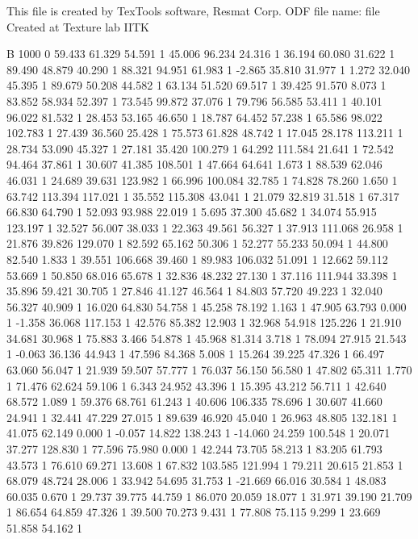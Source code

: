 This file is created by TexTools software, Resmat Corp.
ODF file name: file Created at Texture lab IITK

B 1000 0
	59.433 61.329 54.591 1
	45.006 96.234 24.316 1
	36.194 60.080 31.622 1
	89.490 48.879 40.290 1
	88.321 94.951 61.983 1
	-2.865 35.810 31.977 1
	1.272 32.040 45.395 1
	89.679 50.208 44.582 1
	63.134 51.520 69.517 1
	39.425 91.570 8.073 1
	83.852 58.934 52.397 1
	73.545 99.872 37.076 1
	79.796 56.585 53.411 1
	40.101 96.022 81.532 1
	28.453 53.165 46.650 1
	18.787 64.452 57.238 1
	65.586 98.022 102.783 1
	27.439 36.560 25.428 1
	75.573 61.828 48.742 1
	17.045 28.178 113.211 1
	28.734 53.090 45.327 1
	27.181 35.420 100.279 1
	64.292 111.584 21.641 1
	72.542 94.464 37.861 1
	30.607 41.385 108.501 1
	47.664 64.641 1.673 1
	88.539 62.046 46.031 1
	24.689 39.631 123.982 1
	66.996 100.084 32.785 1
	74.828 78.260 1.650 1
	63.742 113.394 117.021 1
	35.552 115.308 43.041 1
	21.079 32.819 31.518 1
	67.317 66.830 64.790 1
	52.093 93.988 22.019 1
	5.695 37.300 45.682 1
	34.074 55.915 123.197 1
	32.527 56.007 38.033 1
	22.363 49.561 56.327 1
	37.913 111.068 26.958 1
	21.876 39.826 129.070 1
	82.592 65.162 50.306 1
	52.277 55.233 50.094 1
	44.800 82.540 1.833 1
	39.551 106.668 39.460 1
	89.983 106.032 51.091 1
	12.662 59.112 53.669 1
	50.850 68.016 65.678 1
	32.836 48.232 27.130 1
	37.116 111.944 33.398 1
	35.896 59.421 30.705 1
	27.846 41.127 46.564 1
	84.803 57.720 49.223 1
	32.040 56.327 40.909 1
	16.020 64.830 54.758 1
	45.258 78.192 1.163 1
	47.905 63.793 0.000 1
	-1.358 36.068 117.153 1
	42.576 85.382 12.903 1
	32.968 54.918 125.226 1
	21.910 34.681 30.968 1
	75.883 3.466 54.878 1
	45.968 81.314 3.718 1
	78.094 27.915 21.543 1
	-0.063 36.136 44.943 1
	47.596 84.368 5.008 1
	15.264 39.225 47.326 1
	66.497 63.060 56.047 1
	21.939 59.507 57.777 1
	76.037 56.150 56.580 1
	47.802 65.311 1.770 1
	71.476 62.624 59.106 1
	6.343 24.952 43.396 1
	15.395 43.212 56.711 1
	42.640 68.572 1.089 1
	59.376 68.761 61.243 1
	40.606 106.335 78.696 1
	30.607 41.660 24.941 1
	32.441 47.229 27.015 1
	89.639 46.920 45.040 1
	26.963 48.805 132.181 1
	41.075 62.149 0.000 1
	-0.057 14.822 138.243 1
	-14.060 24.259 100.548 1
	20.071 37.277 128.830 1
	77.596 75.980 0.000 1
	42.244 73.705 58.213 1
	83.205 61.793 43.573 1
	76.610 69.271 13.608 1
	67.832 103.585 121.994 1
	79.211 20.615 21.853 1
	68.079 48.724 28.006 1
	33.942 54.695 31.753 1
	-21.669 66.016 30.584 1
	48.083 60.035 0.670 1
	29.737 39.775 44.759 1
	86.070 20.059 18.077 1
	31.971 39.190 21.709 1
	86.654 64.859 47.326 1
	39.500 70.273 9.431 1
	77.808 75.115 9.299 1
	23.669 51.858 54.162 1
